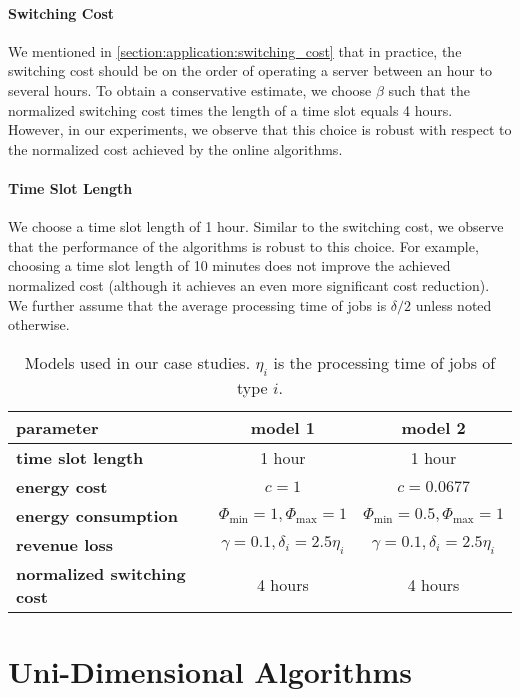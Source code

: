 \paragraph{Switching Cost} We mentioned in \cref{section:application:switching_cost} that in practice, the switching cost should be on the order of operating a server between an hour to several hours. To obtain a conservative estimate, we choose $\beta$ such that the normalized switching cost times the length of a time slot equals 4 hours. However, in our experiments, we observe that this choice is robust with respect to the normalized cost achieved by the online algorithms.

\paragraph{Time Slot Length} We choose a time slot length of 1 hour. Similar to the switching cost, we observe that the performance of the algorithms is robust to this choice. For example, choosing a time slot length of 10 minutes does not improve the achieved normalized cost (although it achieves an even more significant cost reduction). We further assume that the average processing time of jobs is $\delta / 2$ unless noted otherwise.

\begin{table}
    \centering
    \begin{tabular}{>{\bfseries\centering}l|c|c}
        parameter & model 1 & model 2 \\\hline
        time slot length & 1 hour & 1 hour \\
        energy cost & $c=1$ & $c=0.0677$ \\
        energy consumption & $\Phi_{\text{min}}=1, \Phi_{\text{max}}=1$ & $\Phi_{\text{min}}=0.5, \Phi_{\text{max}}=1$ \\
        revenue loss & $\gamma = 0.1, \delta_i = 2.5 \eta_i$ & $\gamma = 0.1, \delta_i = 2.5 \eta_i$ \\
        normalized switching cost & 4 hours & 4 hours \\
    \end{tabular}
    \caption{Models used in our case studies. $\eta_i$ is the processing time of jobs of type $i$.}
    \label{tab:model}
\end{table}

\section{Uni-Dimensional Algorithms}

